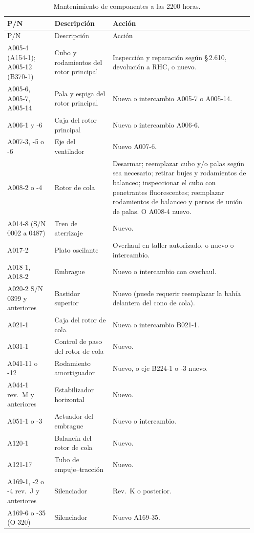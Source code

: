 {\footnotesize
\begin{longtable}{@{}p{2.1cm}p{2.6cm}p{\dimexpr\linewidth-4.7cm-4\tabcolsep}@{}}
\caption{Mantenimiento de componentes a las 2200 horas.}\\
\toprule
P/N & Descripción & Acción \\
\midrule
\endfirsthead
\toprule
P/N & Descripción & Acción \\
\midrule
\endhead
A005-4 (A154-1); A005-12 (B370-1) & Cubo y rodamientos del rotor principal & Inspección y reparación según \S\,2.610, devolución a RHC, o nuevo. \\
A005-6, A005-7, A005-14 & Pala y espiga del rotor principal & Nueva o intercambio A005-7 o A005-14. \\
A006-1 y -6 & Caja del rotor principal & Nueva o intercambio A006-6. \\
A007-3, -5 o -6 & Eje del ventilador & Nuevo A007-6. \\
A008-2 o -4 & Rotor de cola & Desarmar; reemplazar cubo y/o palas según sea necesario; retirar bujes y rodamientos de balanceo; inspeccionar el cubo con penetrantes fluorescentes; reemplazar rodamientos de balanceo y pernos de unión de palas. O A008-4 nuevo. \\
A014-8 (S/N 0002 a 0487) & Tren de aterrizaje & Nuevo. \\
A017-2 & Plato oscilante & Overhaul en taller autorizado, o nuevo o intercambio. \\
A018-1, A018-2 & Embrague & Nuevo o intercambio con overhaul. \\
A020-2 S/N 0399 y anteriores & Bastidor superior & Nuevo (puede requerir reemplazar la bahía delantera del cono de cola). \\
A021-1 & Caja del rotor de cola & Nueva o intercambio B021-1. \\
A031-1 & Control de paso del rotor de cola & Nuevo. \\
A041-11 o -12 & Rodamiento amortiguador & Nuevo, o eje B224-1 o -3 nuevo. \\
A044-1 rev.~M y anteriores & Estabilizador horizontal & Nuevo. \\
A051-1 o -3 & Actuador del embrague & Nuevo o intercambio. \\
A120-1 & Balancín del rotor de cola & Nuevo. \\
A121-17 & Tubo de empuje--tracción & Nuevo. \\
A169-1, -2 o -4 rev.~J y anteriores & Silenciador & Rev.~K o posterior. \\
A169-6 o -35 (O-320) & Silenciador & Nuevo A169-35. \\

\end{longtable}}
